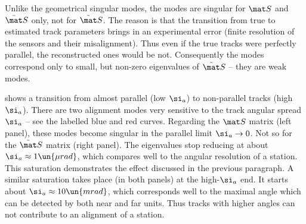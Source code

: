 

Unlike the geometrical singular modes, the modes  are singular for $\mat S$ and $\bar\mat S$ only, not for $\tilde\mat S$. The reason is that the transition  from true to estimated track parameters brings in an experimental error (finite resolution of the sensors and their misalignment). Thus even if the true tracks were perfectly parallel, the reconstructed ones would be not. Consequently the modes  correspond only to small, but non-zero eigenvalues of $\tilde\mat S$ -- they are weak modes.

 shows a transition from almost parallel (low $\si_a$) to non-parallel tracks (high $\si_a$). There are two alignment modes very sensitive to the track angular spread $\si_a$ -- see the labelled blue and red curves. Regarding the $\mat S$ matrix (left panel), these modes become singular in the parallel limit $\si_a \to 0$. Not so for the $\tilde\mat S$ matrix (right panel). The eigenvalues stop reducing at about $\si_a\approx 1\un{\mu rad}$, which compares well to the angular resolution of a station. This saturation demonstrates the effect discussed in the previous paragraph. A similar saturation takes place (in both panels) at the high-$\si_a$ end. It starts about $\si_a \approx 10\un{mrad}$, which corresponds well to the maximal angle which can be detected by both near and far units. Thus tracks with higher angles can not contribute to an alignment of a station.

